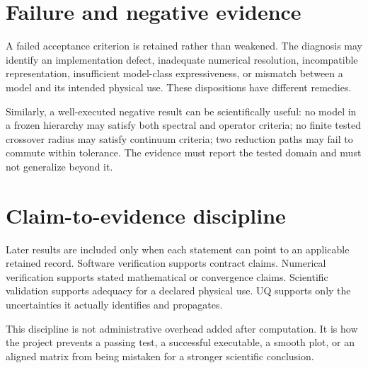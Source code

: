\section{Failure and negative evidence}

A failed acceptance criterion is retained rather than weakened. The diagnosis
may identify an implementation defect, inadequate numerical resolution,
incompatible representation, insufficient model-class expressiveness, or
mismatch between a model and its intended physical use. These dispositions have
different remedies.

Similarly, a well-executed negative result can be scientifically useful: no
model in a frozen hierarchy may satisfy both spectral and operator criteria; no
finite tested crossover radius may satisfy continuum criteria; two reduction
paths may fail to commute within tolerance. The evidence must report the tested
domain and must not generalize beyond it.

\section{Claim-to-evidence discipline}

Later results are included only when each statement can point to an applicable
retained record. Software verification supports contract claims. Numerical
verification supports stated mathematical or convergence claims. Scientific
validation supports adequacy for a declared physical use. UQ supports only the
uncertainties it actually identifies and propagates.

This discipline is not administrative overhead added after computation. It is
how the project prevents a passing test, a successful executable, a smooth plot,
or an aligned matrix from being mistaken for a stronger scientific conclusion.
